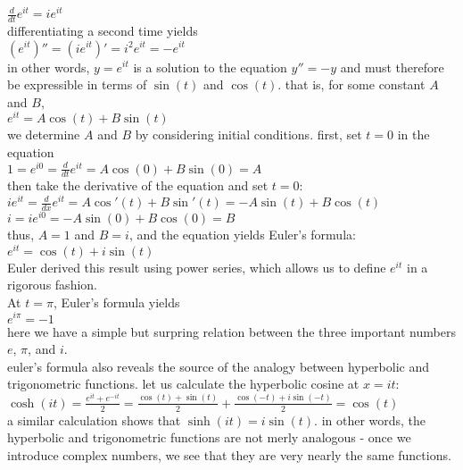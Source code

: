 \documentclass{article}
\begin{document}
$\frac{d}{dt}e^{it} = ie^{it}$\\
differentiating a second time yields\\
$(e^{it})'' = (ie^{it})' = i^2e^{it} = -e^{it}$\\
in other words, $y = e^{it}$ is a solution to the equation $y'' = -y$ and must therefore be expressible in terms of $\sin(t)$ and $\cos(t)$. that is, for some constant $A$ and $B$,\\
$e^{it} = A\cos(t) + B\sin(t)$\\
we determine $A$ and $B$ by considering initial conditions. first, set $t = 0$ in the equation\\
$1 = e^{i0} = \frac{d}{dt}e^{it} = A\cos(0) + B\sin(0) = A$\\
then take the derivative of the equation and set $t = 0$:\\
$ie^{it} = \frac{d}{dx}e^{it} = A\cos'(t) + B\sin'(t) = -A\sin(t) + B\cos(t)$\\
$i = ie^{i0} = -A\sin(0) + B\cos(0) = B$\\
thus, $A = 1$ and $B = i$, and the equation yields Euler's formula:\\
$e^{it} = \cos(t) + i\sin(t)$\\
Euler derived this result using power series, which allows us to define $e^{it}$ in a rigorous fashion.\\ At $t = \pi$, Euler's formula yields\\
$e^{i\pi} = -1$\\
here we have a simple but surpring relation between the three important numbers $e$, $\pi$, and $i$.\\ euler's formula also reveals the source of the analogy between hyperbolic and trigonometric functions. let us calculate the hyperbolic cosine at $x = it$:\\
$\cosh(it) = \frac{e^{it} + e^{-it}}{2} = \frac{\cos(t) + \sin(t)}{2} + \frac{\cos(-t) + i\sin(-t)}{2} = \cos(t)$\\
a similar calculation shows that $\sinh(it) = i\sin(t)$. in other words, the hyperbolic and trigonometric functions are not merly analogous - once we introduce complex numbers, we see that they are very nearly the same functions.\\
\end{document}
